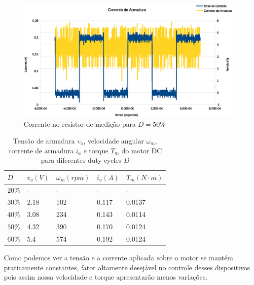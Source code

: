 \documentclass{article}
\begin{document}
\begin{figure}[H]
	\centering
	\includegraphics[width=\linewidth]{Dados/Buck/ia}
	\caption{Corrente no resistor de medição para $D=50\%$}
	\label{fig:iabuck}
\end{figure}

\begin{table}[H]
	\centering
	\caption{Tensão de armadura $v_a$, velocidade angular $\omega_m$, corrente de armadura $i_a$ e torque $T_m$ do motor DC para diferentes duty-cycles $D$}
	\label{tab:vabuck}
	\begin{tabular}{|l|l|l|l|l|}
		\hline
		$D$    & $v_a (V)$ & $\omega_m (rpm)$ & $i_a (A)$ & $T_m (N\cdot m)$ \\ \hline
		$20\%$ & -     & -          & -         & -           \\ \hline
		$30\%$ & 2.18  & 102        & 0.117     & 0.0137      \\ \hline
		$40\%$ & 3.08  & 234        & 0.143     & 0.0114       \\ \hline
		$50\%$ & 4.32  & 390        & 0.170     & 0.0124       \\ \hline
		$60\%$ & 5.4   & 574        & 0.192     & 0.0124       \\ \hline
	\end{tabular}
\end{table}

Como podemos ver a tensão e a corrente aplicada sobre o motor se mantém praticamente constantes, fator altamente desejável no controle desses dispositivos pois assim nossa velocidade e torque apresentarão menos variações.
\end{document}
